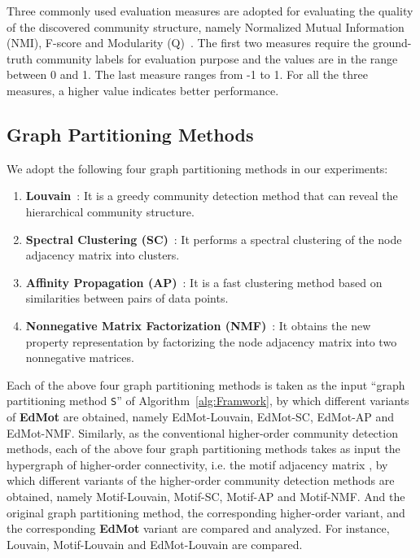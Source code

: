 \documentclass[sigconf]{acmart}
\begin{document}
Three commonly used evaluation measures are adopted for evaluating the quality of the discovered community structure, namely Normalized Mutual Information (NMI), F-score and Modularity (Q)~\cite{chakraborty2014permanence}. The first two measures require the ground-truth community labels for evaluation purpose and the values are in the range between 0 and 1. The last measure  ranges from -1 to 1. For all the three measures, a higher value indicates better performance.




\subsection{Graph Partitioning Methods}
\label{sec:clusteringmethod}
We adopt the following four graph partitioning methods in our experiments:
\begin{enumerate}[1)]
\item
\textbf{Louvain}~\cite{Vincent2008Fast}: It is a greedy community detection method that can reveal the hierarchical community structure.
\item
\textbf{Spectral Clustering (SC)}~\cite{ng2002spectral}: It performs a spectral clustering of the node adjacency matrix into  clusters.
\item
\textbf{Affinity Propagation (AP)}~\cite{frey2007clustering}: It is a fast clustering method based on similarities between pairs of data points.
\item
\textbf{Nonnegative Matrix Factorization (NMF)}~\cite{cai2011graph}: It obtains the new property representation by factorizing the node adjacency matrix into two nonnegative matrices.
\end{enumerate}
Each of the above four graph partitioning methods is taken as the input ``graph partitioning method \texttt{S}'' of Algorithm~\ref{alg:Framwork}, by which different variants of \textbf{EdMot} are obtained, namely EdMot-Louvain, EdMot-SC, EdMot-AP and EdMot-NMF. Similarly, as the conventional higher-order community detection methods, each of the above four graph partitioning methods takes as input the hypergraph of higher-order connectivity, i.e. the motif adjacency matrix , by which different variants of the higher-order community detection methods are obtained, namely Motif-Louvain, Motif-SC, Motif-AP and Motif-NMF. And the original graph partitioning method, the corresponding higher-order variant, and the corresponding \textbf{EdMot} variant are compared and analyzed. For instance, Louvain, Motif-Louvain and EdMot-Louvain are compared.
\end{document}
